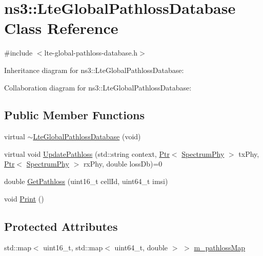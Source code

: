 \hypertarget{classns3_1_1LteGlobalPathlossDatabase}{}\section{ns3\+:\+:Lte\+Global\+Pathloss\+Database Class Reference}
\label{classns3_1_1LteGlobalPathlossDatabase}


{\ttfamily \#include $<$lte-\/global-\/pathloss-\/database.\+h$>$}



Inheritance diagram for ns3\+:\+:Lte\+Global\+Pathloss\+Database\+:


Collaboration diagram for ns3\+:\+:Lte\+Global\+Pathloss\+Database\+:
\subsection*{Public Member Functions}
\begin{DoxyCompactItemize}
\item 
virtual \hyperlink{classns3_1_1LteGlobalPathlossDatabase_a92b6c2f86e6159cb1f41e63673229e65}{$\sim$\+Lte\+Global\+Pathloss\+Database} (void)
\item 
virtual void \hyperlink{classns3_1_1LteGlobalPathlossDatabase_ad787865c41ddf1ff7a8a269afba7ccfc}{Update\+Pathloss} (std\+::string context, \hyperlink{classns3_1_1Ptr}{Ptr}$<$ \hyperlink{classns3_1_1SpectrumPhy}{Spectrum\+Phy} $>$ tx\+Phy, \hyperlink{classns3_1_1Ptr}{Ptr}$<$ \hyperlink{classns3_1_1SpectrumPhy}{Spectrum\+Phy} $>$ rx\+Phy, double loss\+Db)=0
\item 
double \hyperlink{classns3_1_1LteGlobalPathlossDatabase_a06da4a86a140c90b2dad5f5fad9868f3}{Get\+Pathloss} (uint16\+\_\+t cell\+Id, uint64\+\_\+t imsi)
\item 
void \hyperlink{classns3_1_1LteGlobalPathlossDatabase_a4b89b48f47321bab1f721356255b0822}{Print} ()
\end{DoxyCompactItemize}
\subsection*{Protected Attributes}
\begin{DoxyCompactItemize}
\item 
std\+::map$<$ uint16\+\_\+t, std\+::map$<$ uint64\+\_\+t, double $>$ $>$ \hyperlink{classns3_1_1LteGlobalPathlossDatabase_a3a193fa1babca27aa0a2dfccebf8c0ab}{m\+\_\+pathloss\+Map}
\end{DoxyCompactItemize}


